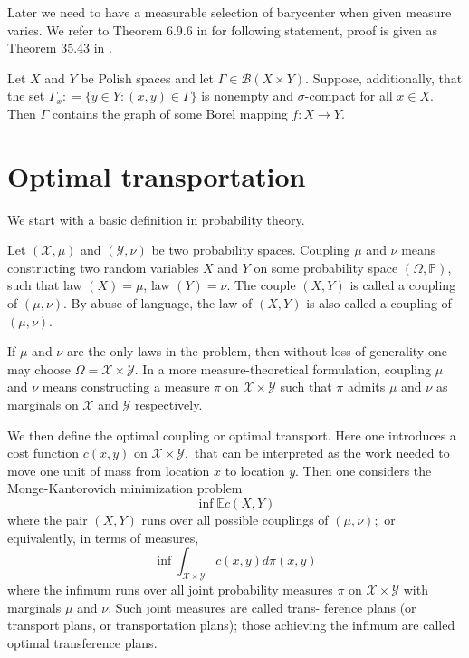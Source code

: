 Later we need to have a measurable selection of barycenter when given measure varies. We refer to Theorem 6.9.6 in \cite{Bogachev2007} for following statement, proof is given as Theorem 35.43 in \cite{kechris1995}.

\begin{thm}
	\label{thm:measurale_selection}
	Let \( X \) and \( Y \) be Polish spaces and let \( \Gamma \in \mathcal { B } ( X \times Y ) \). Suppose, additionally, that the set \( \Gamma _ { x }: = \{ y \in Y: ( x , y ) \in \Gamma \} \) is nonempty and \( \sigma \)-compact for all \( x \in X \). Then \( \Gamma \) contains the graph of some Borel mapping \( f: X \rightarrow Y\).
\end{thm}

\section{Optimal transportation}
We start with a basic definition in probability theory.

\begin{defn}[Coupling]
	Let \( ( \mathcal { X } , \mu ) \) and \( ( \mathcal { Y } , \nu ) \) be two probability spaces. Coupling \( \mu \) and \( \nu \) means constructing two random variables \( X \) and \( Y \) on some probability space \( ( \Omega , \mathbb { P } ) , \) such that law \( ( X ) = \mu \), law \( ( Y ) = \nu . \) The couple \( ( X , Y ) \) is called a coupling of \( ( \mu , \nu ) . \) By abuse of language, the law of \( ( X , Y ) \) is also called a coupling of \( ( \mu , \nu ) \).
\end{defn}

If \( \mu \) and \( \nu \) are the only laws in the problem, then without loss of generality one may choose \( \Omega = \mathcal { X } \times \mathcal { Y } . \) In a more measure-theoretical formulation, coupling \( \mu \) and \( \nu \) means constructing a measure \( \pi \) on \( \mathcal { X } \times \mathcal { Y } \) such that \( \pi \) admits \( \mu \) and \( \nu \) as marginals on \( \mathcal { X } \) and \( \mathcal { Y } \) respectively.


We then define the optimal coupling or optimal transport. Here one introduces a cost function \( c ( x , y ) \) on \( \mathcal { X } \times \mathcal { Y } , \) that can be interpreted as the work needed to move one unit of mass from location \( x \) to location \( y . \) Then one considers the Monge-Kantorovich minimization problem
\[
	\operatorname{inf}  \mathbb { E } c ( X , Y )
\]
where the pair \( ( X , Y ) \) runs over all possible couplings of \( ( \mu , \nu ) ; \) or equivalently, in terms of measures,
\[ \inf \int _ { \mathcal { X } \times \mathcal { Y } } c ( x , y ) d \pi ( x , y ) \]
where the infimum runs over all joint probability measures \( \pi \) on \( \mathcal { X } \times \mathcal { Y } \) with marginals \( \mu \) and \( \nu . \) Such joint measures are called trans- ference plans (or transport plans, or transportation plans); those achieving the infimum are called optimal transference plans.

